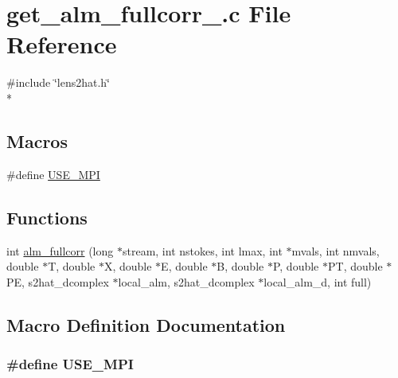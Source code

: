 \section{get\-\_\-alm\-\_\-fullcorr\-\_.\-c File Reference}
\label{get__alm__fullcorr__20120120_8c}
{\ttfamily \#include \char`\"{}lens2hat.\-h\char`\"{}}\\*
\subsection*{Macros}
\begin{DoxyCompactItemize}
\item 
\#define \hyperlink{get__alm__fullcorr__20120120_8c_a3869d282031f6ea6b50fdb980b758420}{U\-S\-E\-\_\-\-M\-P\-I}
\end{DoxyCompactItemize}
\subsection*{Functions}
\begin{DoxyCompactItemize}
\item 
int \hyperlink{get__alm__fullcorr__20120120_8c_a66df8465f1ae10f3699210532ca527e1}{alm\-\_\-fullcorr} (long $\ast$stream, int nstokes, int lmax, int $\ast$mvals, int nmvals, double $\ast$T, double $\ast$X, double $\ast$E, double $\ast$B, double $\ast$P, double $\ast$P\-T, double $\ast$P\-E, s2hat\-\_\-dcomplex $\ast$local\-\_\-alm, s2hat\-\_\-dcomplex $\ast$local\-\_\-alm\-\_\-d, int full)
\end{DoxyCompactItemize}


\subsection{Macro Definition Documentation}
\subsubsection[{U\-S\-E\-\_\-\-M\-P\-I}]{\setlength{\rightskip}{0pt plus 5cm}\#define U\-S\-E\-\_\-\-M\-P\-I}\label{get__alm__fullcorr__20120120_8c_a3869d282031f6ea6b50fdb980b758420}


